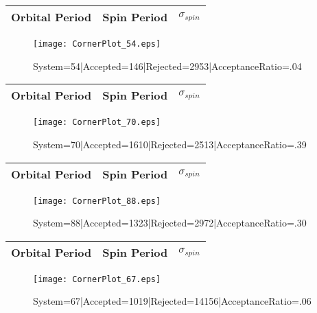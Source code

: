 \documentclass[10pt]{article}
\begin{document}
\begin{center}
        \begin{tabular}{|c|c|c|}
        \hline
Orbital Period & Spin Period & $\sigma_{spin}$ \\
 \hline
        \end{tabular}
        \end{center}
\begin{figure}[h] 
        \texttt{[image: CornerPlot\_54.eps]}
        \caption{System=54|Accepted=146|Rejected=2953|AcceptanceRatio=.04}
        \label{S54}
        \centering
        \end{figure}
\begin{center}
        \begin{tabular}{|c|c|c|}
        \hline
Orbital Period & Spin Period & $\sigma_{spin}$ \\
 \hline
        \end{tabular}
        \end{center}
\begin{figure}[h] 
        \texttt{[image: CornerPlot\_70.eps]}
        \caption{System=70|Accepted=1610|Rejected=2513|AcceptanceRatio=.39}
        \label{S70}
        \centering
        \end{figure}
\begin{center}
        \begin{tabular}{|c|c|c|}
        \hline
Orbital Period & Spin Period & $\sigma_{spin}$ \\
 \hline
        \end{tabular}
        \end{center}
\begin{figure}[h] 
        \texttt{[image: CornerPlot\_88.eps]}
        \caption{System=88|Accepted=1323|Rejected=2972|AcceptanceRatio=.30}
        \label{S88}
        \centering
        \end{figure}
\begin{center}
        \begin{tabular}{|c|c|c|}
        \hline
Orbital Period & Spin Period & $\sigma_{spin}$ \\
 \hline
        \end{tabular}
        \end{center}
\begin{figure}[h] 
        \texttt{[image: CornerPlot\_67.eps]}
        \caption{System=67|Accepted=1019|Rejected=14156|AcceptanceRatio=.06}
        \label{S67}
        \centering
        \end{figure}
\end{document}
